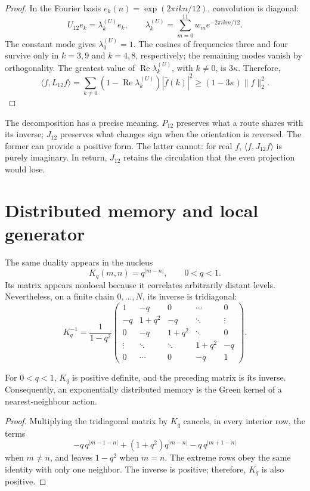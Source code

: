 \begin{proof}
In the Fourier basis
\(e_k(n)=\exp(2\pi ikn/12)\), convolution is diagonal:
\[
 U_{12}e_k=\lambda_k^{(U)}e_k,\qquad
 \lambda_k^{(U)}=\sum_{m=0}^{11}w_m e^{-2\pi ikm/12}.
\]
The constant mode gives \(\lambda_0^{(U)}=1\).  The cosines of frequencies three and
four survive only in \(k=3,9\) and \(k=4,8\), respectively; the remaining
modes vanish by orthogonality.  The greatest value of
\(\operatorname{Re}\lambda_k^{(U)}\), with \(k\neq0\), is \(3\kappa\).  Therefore,
\[
 \langle f,L_{12}f\rangle
 =\sum_{k\neq0}(1-\operatorname{Re}\lambda_k^{(U)})|\widehat f(k)|^2
 \geq(1-3\kappa)\|f\|_2^2.
\]
\end{proof}

The decomposition has a precise meaning. \(P_{12}\) preserves what a route shares with its inverse; \(J_{12}\) preserves what changes sign when the orientation is reversed. The former can provide a positive form. The latter cannot: for real \(f\), \(\langle f,J_{12}f\rangle\) is purely imaginary. In return, \(J_{12}\) retains the circulation that the even projection would lose.

\section{Distributed memory and local generator}

The same duality appears in the nucleus
\[
 K_q(m,n)=q^{|m-n|},\qquad 0<q<1.
\]
Its matrix appears nonlocal because it correlates arbitrarily
distant levels. Nevertheless, on a finite chain \(0,\ldots,N\), its inverse
is tridiagonal:
\[
 K_q^{-1}
 =\frac1{1-q^2}
 \begin{pmatrix}
 1&-q&0&\cdots&0\\
 -q&1+q^2&-q&\ddots&\vdots\\
 0&-q&1+q^2&\ddots&0\\
 \vdots&\ddots&\ddots&1+q^2&-q\\
 0&\cdots&0&-q&1
 \end{pmatrix}.
\]

\begin{proposition}
\label{prop:green-local-memoria-rev6}
For \(0<q<1\), \(K_q\) is positive definite, and the preceding matrix is its
inverse.  Consequently, an exponentially distributed memory is the
Green kernel of a nearest-neighbour action.
\end{proposition}

\begin{proof}
Multiplying the tridiagonal matrix by \(K_q\) cancels, in every interior row,
the terms
\[
 -q\,q^{|m-1-n|}
 +(1+q^2)q^{|m-n|}
 -q\,q^{|m+1-n|}
\]
when \(m\neq n\), and leaves \(1-q^2\) when \(m=n\). The extreme rows
obey the same identity with only one neighbor. The inverse is positive;
therefore, \(K_q\) is also positive.
\end{proof}

